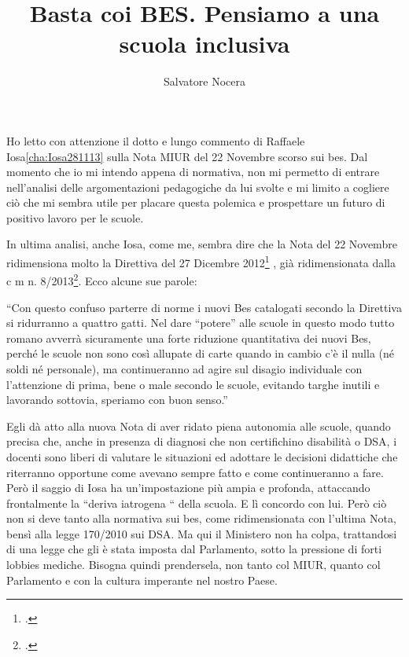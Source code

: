\author{Salvatore Nocera}
\title{Basta coi BES. Pensiamo a una scuola inclusiva}
\label{cha:nocera021213}
\maketitle
{}
Ho letto con attenzione il dotto e lungo commento di Raffaele Iosa\ref{cha:Iosa281113} sulla Nota MIUR del 22 Novembre scorso sui bes. Dal momento che io mi intendo appena di normativa, non mi permetto di entrare nell’analisi delle argomentazioni pedagogiche da lui svolte e mi limito a cogliere ciò che mi sembra utile per placare questa polemica e prospettare un futuro di positivo lavoro per le scuole.

In ultima analisi, anche Iosa, come me, sembra dire che la Nota del 22 Novembre ridimensiona molto la Direttiva del 27 Dicembre 2012\footcite{dir27Dic2012} , già ridimensionata dalla c m n. 8/2013\footcite{cm8_2013}. Ecco alcune sue parole:

“Con questo confuso parterre di norme i nuovi Bes catalogati secondo la Direttiva si ridurranno a quattro gatti. Nel dare “potere” alle scuole in questo modo tutto romano avverrà sicuramente una forte riduzione quantitativa dei nuovi Bes, perché le scuole non sono così allupate di carte quando in cambio c’è il nulla (né soldi né personale), ma continueranno ad agire sul disagio individuale con l’attenzione di prima, bene o male secondo le scuole, evitando targhe inutili e lavorando sottovia, speriamo con buon senso.”

Egli dà atto alla nuova Nota di aver ridato piena autonomia alle scuole, quando precisa che, anche in presenza di diagnosi che non certifichino disabilità o DSA, i docenti sono liberi di valutare le situazioni ed adottare le decisioni didattiche che riterranno opportune come avevano sempre fatto e come continueranno a fare. Però il saggio di Iosa ha un’impostazione più ampia e profonda, attaccando frontalmente la “deriva iatrogena “ della scuola. E lì concordo con lui. Però ciò non si deve tanto alla normativa sui bes, come ridimensionata con l’ultima Nota, bensì alla legge 170/2010 sui DSA. Ma qui il Ministero non ha colpa, trattandosi di una legge che gli è stata imposta dal Parlamento, sotto la pressione di forti lobbies mediche. Bisogna quindi prendersela, non tanto col MIUR, quanto col Parlamento e con la cultura imperante nel nostro Paese.

